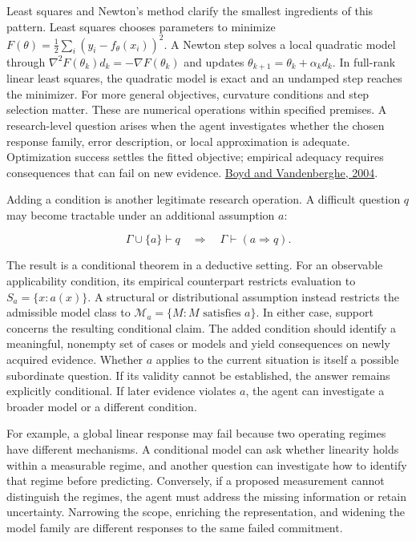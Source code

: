\documentclass[11pt,a4paper]{article}
\begin{document}
Least squares and Newton's method clarify the smallest ingredients of this pattern. Least squares chooses parameters to minimize \(F(\theta)=\tfrac12\sum_i(y_i-f_\theta(x_i))^2\). A Newton step solves a local quadratic model through \(\nabla^2F(\theta_k)d_k=-\nabla F(\theta_k)\) and updates \(\theta_{k+1}=\theta_k+\alpha_kd_k\). In full-rank linear least squares, the quadratic model is exact and an undamped step reaches the minimizer. For more general objectives, curvature conditions and step selection matter. These are numerical operations within specified premises. A research-level question arises when the agent investigates whether the chosen response family, error description, or local approximation is adequate. Optimization success settles the fitted objective; empirical adequacy requires consequences that can fail on new evidence. \href{https://web.stanford.edu/~boyd/cvxbook/bv_cvxbook.pdf}{Boyd and Vandenberghe, 2004}.


Adding a condition is another legitimate research operation. A difficult question \(q\) may become tractable under an additional assumption \(a\):


\[
\Gamma\cup\{a\}\vdash q
\quad\Longrightarrow\quad
\Gamma\vdash(a\Rightarrow q).
\]


The result is a conditional theorem in a deductive setting. For an observable applicability condition, its empirical counterpart restricts evaluation to \(S_a=\{x:a(x)\}\). A structural or distributional assumption instead restricts the admissible model class to \(\mathcal M_a=\{M:M\text{ satisfies }a\}\). In either case, support concerns the resulting conditional claim. The added condition should identify a meaningful, nonempty set of cases or models and yield consequences on newly acquired evidence. Whether \(a\) applies to the current situation is itself a possible subordinate question. If its validity cannot be established, the answer remains explicitly conditional. If later evidence violates \(a\), the agent can investigate a broader model or a different condition.


For example, a global linear response may fail because two operating regimes have different mechanisms. A conditional model can ask whether linearity holds within a measurable regime, and another question can investigate how to identify that regime before predicting. Conversely, if a proposed measurement cannot distinguish the regimes, the agent must address the missing information or retain uncertainty. Narrowing the scope, enriching the representation, and widening the model family are different responses to the same failed commitment.
\end{document}

